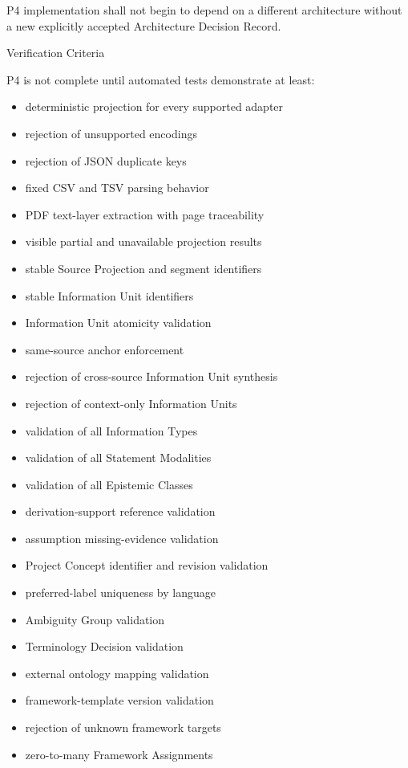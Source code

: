 P4 implementation shall not begin to depend on a different architecture without a new explicitly accepted Architecture Decision Record.

Verification Criteria

P4 is not complete until automated tests demonstrate at least:

\begin{itemize}
\tightlist
\item
  deterministic projection for every supported adapter
\item
  rejection of unsupported encodings
\item
  rejection of JSON duplicate keys
\item
  fixed CSV and TSV parsing behavior
\item
  PDF text-layer extraction with page traceability
\item
  visible partial and unavailable projection results
\item
  stable Source Projection and segment identifiers
\item
  stable Information Unit identifiers
\item
  Information Unit atomicity validation
\item
  same-source anchor enforcement
\item
  rejection of cross-source Information Unit synthesis
\item
  rejection of context-only Information Units
\item
  validation of all Information Types
\item
  validation of all Statement Modalities
\item
  validation of all Epistemic Classes
\item
  derivation-support reference validation
\item
  assumption missing-evidence validation
\item
  Project Concept identifier and revision validation
\item
  preferred-label uniqueness by language
\item
  Ambiguity Group validation
\item
  Terminology Decision validation
\item
  external ontology mapping validation
\item
  framework-template version validation
\item
  rejection of unknown framework targets
\item
  zero-to-many Framework Assignments

\end{itemize}

